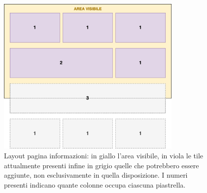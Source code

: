 \begin{figure}[h]
  \centering
  \includegraphics[width=9cm]{img/totem/layout_gridview.png}
  \caption[Layout pagina informazioni]{Layout pagina informazioni: in giallo l'area visibile, in viola le tile attualmente presenti infine in grigio quelle che potrebbero essere aggiunte, non esclusivamente in quella disposizione. I numeri presenti indicano quante colonne occupa ciascuna piastrella.}
  \label{fig:infopageLayout}
\end{figure}
%
